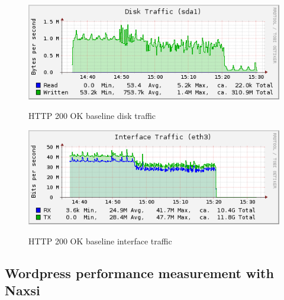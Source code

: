 \documentclass[Measurement results]{subfiles}
\begin{document}
\begin{figure}[H]
\centering
\caption{HTTP 200 OK baseline disk traffic}
\includegraphics[scale=0.7]{images/results/baseline_200/disk.png}
\label{fig:Baseline Nginx disk traffic}
\end{figure}

\begin{figure}[H]
\centering
\caption{HTTP 200 OK baseline interface traffic}
\includegraphics[scale=0.7]{images/results/baseline_200/interface.png}
\label{fig:Baseline Nginx interface traffic}
\end{figure}

\subsection{Wordpress performance measurement with Naxsi}
\end{document}
